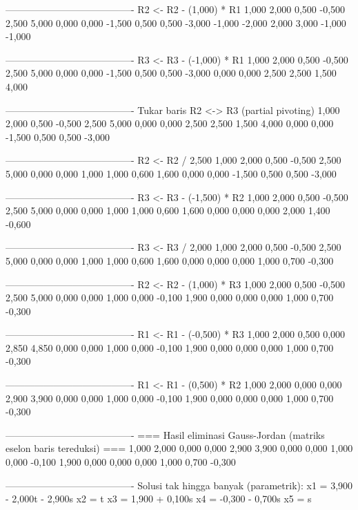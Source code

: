 \documentclass[12pt]{article}
\begin{document}
\begin{enumerate}
\begin{keluaran}
----------------------------------------
R2 <- R2 - (1,000) * R1
1,000   2,000   0,500   -0,500  2,500   5,000
0,000   0,000   -1,500  0,500   0,500   -3,000
-1,000  -2,000  2,000   3,000   -1,000  -1,000

----------------------------------------
R3 <- R3 - (-1,000) * R1
1,000   2,000   0,500   -0,500  2,500   5,000
0,000   0,000   -1,500  0,500   0,500   -3,000
0,000   0,000   2,500   2,500   1,500   4,000

----------------------------------------
Tukar baris R2 <-> R3 (partial pivoting)
1,000   2,000   0,500   -0,500  2,500   5,000
0,000   0,000   2,500   2,500   1,500   4,000
0,000   0,000   -1,500  0,500   0,500   -3,000

----------------------------------------
R2 <- R2 / 2,500
1,000   2,000   0,500   -0,500  2,500   5,000
0,000   0,000   1,000   1,000   0,600   1,600
0,000   0,000   -1,500  0,500   0,500   -3,000

----------------------------------------
R3 <- R3 - (-1,500) * R2
1,000   2,000   0,500   -0,500  2,500   5,000
0,000   0,000   1,000   1,000   0,600   1,600
0,000   0,000   0,000   2,000   1,400   -0,600

----------------------------------------
R3 <- R3 / 2,000
1,000   2,000   0,500   -0,500  2,500   5,000
0,000   0,000   1,000   1,000   0,600   1,600
0,000   0,000   0,000   1,000   0,700   -0,300

----------------------------------------
R2 <- R2 - (1,000) * R3
1,000   2,000   0,500   -0,500  2,500   5,000
0,000   0,000   1,000   0,000   -0,100  1,900
0,000   0,000   0,000   1,000   0,700   -0,300

----------------------------------------
R1 <- R1 - (-0,500) * R3
1,000   2,000   0,500   0,000   2,850   4,850
0,000   0,000   1,000   0,000   -0,100  1,900
0,000   0,000   0,000   1,000   0,700   -0,300

----------------------------------------
R1 <- R1 - (0,500) * R2
1,000   2,000   0,000   0,000   2,900   3,900
0,000   0,000   1,000   0,000   -0,100  1,900
0,000   0,000   0,000   1,000   0,700   -0,300

----------------------------------------
=== Hasil eliminasi Gauss-Jordan (matriks eselon baris tereduksi) ===
1,000   2,000   0,000   0,000   2,900   3,900
0,000   0,000   1,000   0,000   -0,100  1,900
0,000   0,000   0,000   1,000   0,700   -0,300

----------------------------------------
Solusi tak hingga banyak (parametrik):
x1 = 3,900 - 2,000t - 2,900s
x2 = t
x3 = 1,900 + 0,100s
x4 = -0,300 - 0,700s
x5 = s


\end{keluaran}
\end{enumerate}
\end{document}
